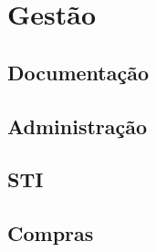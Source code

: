 \chapter{Gestão}

\section{Documentação}

\newpage
\section{Administração}

\newpage
\section{STI}

\section{Compras}






